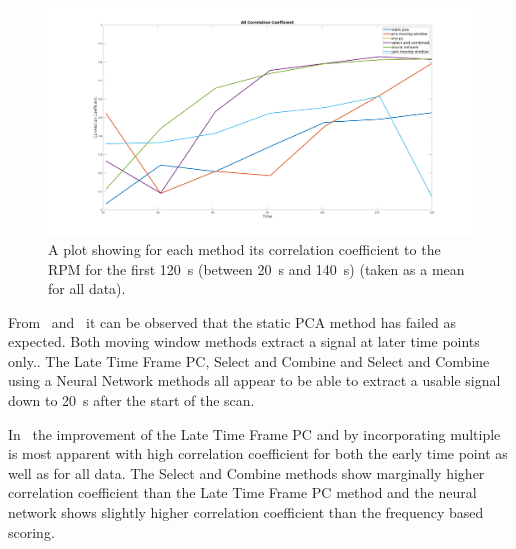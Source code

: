     \begin{figure}
        \centering
        
        \includegraphics[width=0.9\linewidth]{figures/all_correlation_coefficient.png}
        
        \captionsetup{singlelinecheck=false, justification=centering}
        \caption{A plot showing for each method its correlation coefficient to the \gls{RPM} for the first \SI{120}{\second} (between \SI{20}{\second} and \SI{140}{\second}) (taken as a mean for all data).}
        \label{fig:all_cross_correlation}
    \end{figure}
    
        
        
    
     From~ and~ it can be observed that the static \gls{PCA} method has failed as expected. Both moving window methods extract a signal at later time points only.. The Late Time Frame \gls{PC}, Select and Combine and Select and Combine using a Neural Network methods all appear to be able to extract a usable signal down to \SI{20}{\second} after the start of the scan.
    
    In~ the improvement of the Late Time Frame \gls{PC} and by incorporating multiple  is most apparent with high correlation coefficient for both the early time point as well as for all data. The Select and Combine methods show marginally higher correlation coefficient than the Late Time Frame \gls{PC} method and the neural network shows slightly higher correlation coefficient than the frequency based scoring.
    
